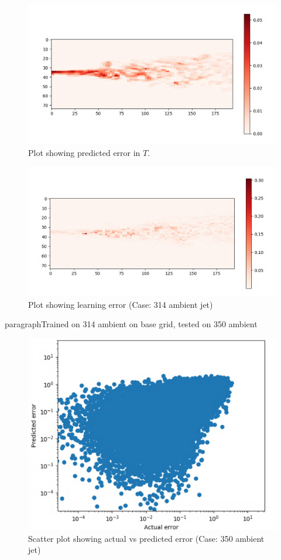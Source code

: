 \documentclass{article}
\begin{document}
\begin{figure}[h!]
    \centering
    \includegraphics[width = 0.9\linewidth]{figures/314_350_01_cnn_grad_pred.png}
    \caption{Plot showing predicted error in $T$.}
    \label{amr_err}
\end{figure}

\begin{figure}[h!]
    \centering
    \includegraphics[width = 0.9\linewidth]{figures/314_350_01_cnn_grad_error.png}
    \caption{Plot showing learning error (Case: 314 ambient jet)}
    \label{amr_err}
\end{figure}

paragraph{Trained on 314 ambient on base grid, tested on 350 ambient}

\begin{figure}[h!]
    \centering
    \includegraphics[width=0.6\linewidth]{figures/314_350_cnn_error_scatter.png}
    \caption{Scatter plot showing actual vs predicted error (Case: 350 ambient jet)}
    \label{amr_err}
\end{figure}
\end{document}
